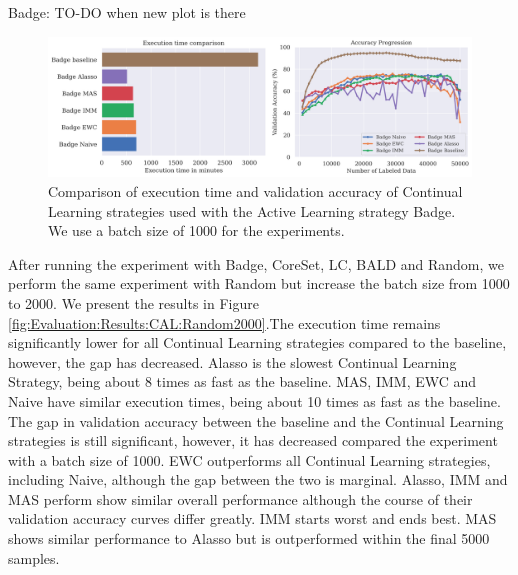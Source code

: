 Badge: TO-DO when new plot is there

\begin{figure}[h]
    \centering
    \includegraphics[width=\linewidth]{images/results_CAL/Badge_CAL_1000b.png}
    \caption[Continual Active Learning Badge 1000 batch size]{Comparison of execution time and validation accuracy of Continual Learning strategies used with the Active Learning strategy
    Badge. We use a batch size of 1000 for the experiments. }
    \label{fig:Evaluation:Results:CAL:Badge1000}
\end{figure}

After running the experiment with Badge, CoreSet, LC, BALD and Random, we perform the same experiment with Random but increase the batch size from 1000 to 2000. We present the results in
Figure \ref{fig:Evaluation:Results:CAL:Random2000}.The execution time remains significantly lower for all Continual Learning strategies compared to the baseline, however, the gap has decreased. 
Alasso is the slowest Continual Learning Strategy, being about 8 times as fast as the baseline. MAS, IMM, EWC and Naive have similar execution times, being about 10 times as fast as the baseline. 
The gap in validation accuracy between the baseline and the Continual Learning strategies is still significant, however, it has decreased compared the experiment with a batch size of 1000.
EWC outperforms all Continual Learning strategies, including Naive, although the gap between the two is marginal. Alasso, IMM and MAS perform show similar overall performance although the course
of their validation accuracy curves differ greatly. IMM starts worst and ends best. MAS shows similar performance to Alasso but is outperformed within the final 5000 samples. \par

